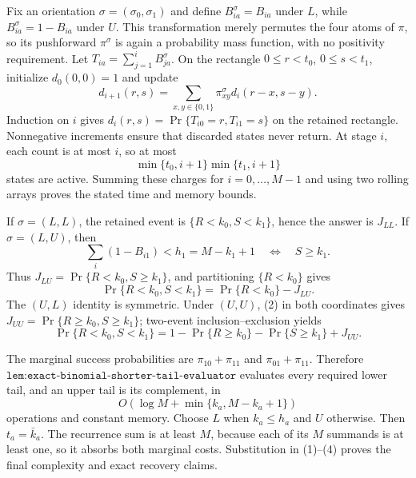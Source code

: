 Fix an orientation \(\sigma=(\sigma_0,\sigma_1)\) and define \(B_{ia}^{\sigma}=B_{ia}\) under \(L\), while \(B_{ia}^{\sigma}=1-B_{ia}\) under \(U\). This transformation merely permutes the four atoms of \(\pi\), so its pushforward \(\pi^\sigma\) is again a probability mass function, with no positivity requirement. Let \(T_{ia}=\sum_{j=1}^iB_{ja}^{\sigma}\). On the rectangle \(0\le r<t_0\), \(0\le s<t_1\), initialize \(d_0(0,0)=1\) and update
\[
d_{i+1}(r,s)=\sum_{x,y\in\{0,1\}}\pi^\sigma_{xy}d_i(r-x,s-y). \tag{1}
\]
Induction on \(i\) gives \(d_i(r,s)=\Pr\{T_{i0}=r,T_{i1}=s\}\) on the retained rectangle. Nonnegative increments ensure that discarded states never return. At stage \(i\), each count is at most \(i\), so at most
\[
\min\{t_0,i+1\}\min\{t_1,i+1\}
\]
states are active. Summing these charges for \(i=0,\ldots,M-1\) and using two rolling arrays proves the stated time and memory bounds.

If \(\sigma=(L,L)\), the retained event is \(\{R<k_0,S<k_1\}\), hence the answer is \(J_{LL}\). If \(\sigma=(L,U)\), then
\[
\sum_i(1-B_{i1})<h_1=M-k_1+1
\quad\Longleftrightarrow\quad S\ge k_1. \tag{2}
\]
Thus \(J_{LU}=\Pr\{R<k_0,S\ge k_1\}\), and partitioning \(\{R<k_0\}\) gives
\[
\Pr\{R<k_0,S<k_1\}=\Pr\{R<k_0\}-J_{LU}. \tag{3}
\]
The \((U,L)\) identity is symmetric. Under \((U,U)\), (2) in both coordinates gives \(J_{UU}=\Pr\{R\ge k_0,S\ge k_1\}\); two-event inclusion--exclusion yields
\[
\Pr\{R<k_0,S<k_1\}
=1-\Pr\{R\ge k_0\}-\Pr\{S\ge k_1\}+J_{UU}. \tag{4}
\]

The marginal success probabilities are \(\pi_{10}+\pi_{11}\) and \(\pi_{01}+\pi_{11}\). Therefore \(\texttt{lem:exact-binomial-shorter-tail-evaluator}\) evaluates every required lower tail, and an upper tail is its complement, in
\[
O\!\left(\log M+\min\{k_a,M-k_a+1\}\right)
\]
operations and constant memory. Choose \(L\) when \(k_a\le h_a\) and \(U\) otherwise. Then \(t_a=\bar k_a\). The recurrence sum is at least \(M\), because each of its \(M\) summands is at least one, so it absorbs both marginal costs. Substitution in (1)--(4) proves the final complexity and exact recovery claims.
